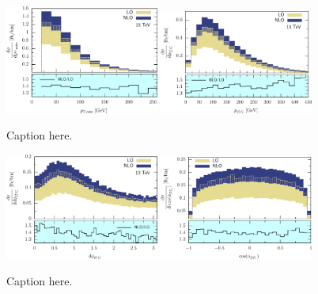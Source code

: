 \documentclass[preprint]{JHEP3} %
\begin{document}
\begin{figure}[h]
\centering %
\includegraphics[width=0.45\textwidth]{./LHC_53_Fig08.eps}
\hfill
\includegraphics[width=0.45\textwidth]{./LHC_53_Fig12.eps}
\caption{\label{fig:i} Caption here.}
\end{figure}



\begin{figure}[h]
\centering %
\includegraphics[width=0.45\textwidth]{./LHC_53_Fig17.eps}
\hfill
\includegraphics[width=0.45\textwidth]{./LHC_53_Fig18.eps}
\caption{\label{fig:i} Caption here.}
\end{figure}
\end{document}
